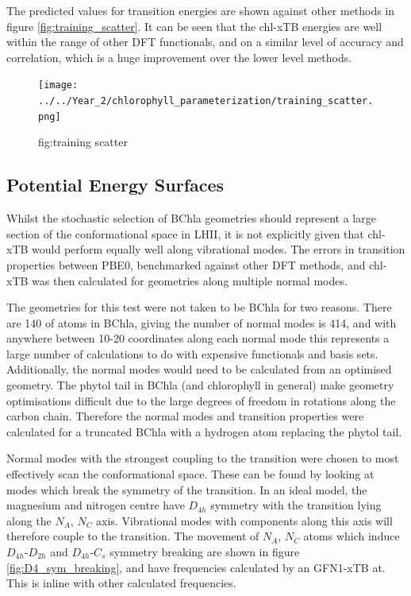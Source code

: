 The predicted values for \Qy transition energies are shown against other methods
in figure \ref{fig:training_scatter}. It can be seen that the chl-xTB energies are
well within the range of other DFT functionals, and on a similar level of accuracy
and correlation, which is a huge improvement over the lower level methods.

\begin{figure}
    \texttt{[image: ../../Year\_2/chlorophyll\_parameterization/training\_scatter.png]}
    \caption{fig:training scatter}
\end{figure}

\afterpartskip
\subsection{Potential Energy Surfaces}
\label{subsec:pot_energy_surfaces}

Whilst the stochastic selection of BChla geometries should represent a large section 
of the conformational space in LHII, it is not explicitly given that chl-xTB would
perform equally well along vibrational modes. The errors in transition properties
between PBE0, benchmarked against other DFT methods, and chl-xTB was then calculated 
for geometries along multiple normal modes.

The geometries for this test were not taken to be BChla for two reasons. There are
140 of atoms in BChla, giving the number of normal modes is 414, and with
anywhere between 10-20 coordinates along each normal mode this represents a large
number of calculations to do with expensive functionals and basis sets. Additionally,
the normal modes would need to be calculated from an optimised geometry. The phytol
tail in BChla (and chlorophyll in general) make geometry optimisations difficult
due to the large degrees of freedom in rotations along the carbon chain. Therefore
the normal modes and transition properties were calculated for a truncated BChla
with a hydrogen atom replacing the phytol tail.

Normal modes with the strongest coupling to the \Qy transition were chosen to most
effectively scan the conformational space. These can be found by looking at modes
which break the symmetry of the \Qy transition. In an ideal model, the magnesium
and nitrogen centre have $D_{4h}$ symmetry with the \Qy transition lying along 
the $N_A$, $N_C$ axis. Vibrational modes with components along this axis will
therefore couple to the transition. The movement of $N_A$, $N_C$ atoms which induce
$D_{4h}$-$D_{2h}$ and $D_{4h}$-$C_{s}$ symmetry breaking are shown in figure \ref{fig:D4_sym_breaking},
and have frequencies calculated by an GFN1-xTB at. This is inline with other calculated
frequencies.

